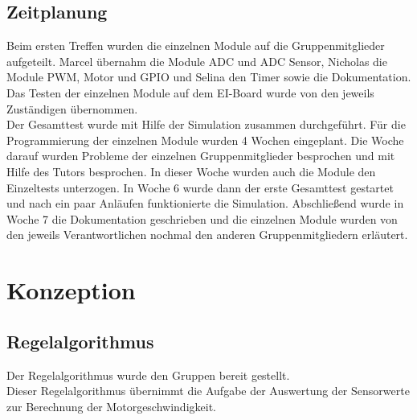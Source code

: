 \documentclass[a4paper,10pt,twoside]{report}
\begin{document}
\section{Zeitplanung}
Beim ersten Treffen wurden die einzelnen Module auf die Gruppenmitglieder aufgeteilt. Marcel übernahm die Module ADC und ADC Sensor, Nicholas die Module PWM, Motor und GPIO und Selina den Timer sowie die Dokumentation. Das Testen der einzelnen Module auf dem EI-Board wurde von den jeweils Zuständigen übernommen.\\
Der Gesamttest wurde mit Hilfe der Simulation zusammen durchgeführt. Für die Programmierung der einzelnen Module wurden 4 Wochen eingeplant. Die Woche darauf wurden Probleme der einzelnen Gruppenmitglieder besprochen und mit Hilfe des Tutors besprochen. In dieser Woche wurden auch die Module den Einzeltests unterzogen. In Woche 6 wurde dann der erste Gesamttest gestartet und nach ein paar Anläufen funktionierte die Simulation. Abschließend wurde in Woche 7 die Dokumentation geschrieben und die einzelnen Module wurden von den jeweils Verantwortlichen nochmal den anderen Gruppenmitgliedern erläutert.

\chapter{Konzeption}
\section{Regelalgorithmus}
Der Regelalgorithmus wurde den Gruppen bereit gestellt.\\
Dieser Regelalgorithmus übernimmt die Aufgabe der Auswertung der Sensorwerte zur Berechnung der Motorgeschwindigkeit.
\end{document}
